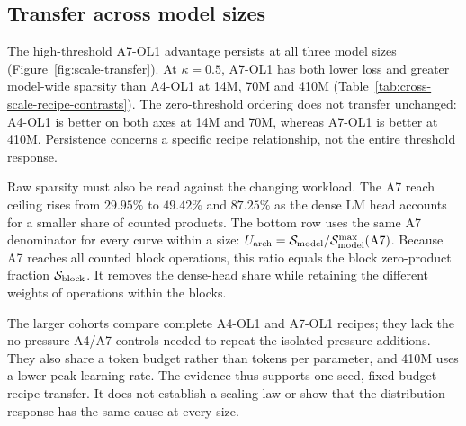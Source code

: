 \subsection{Transfer across model sizes}
\label{sec:scale-results}

The high-threshold A7-OL1 advantage persists at all three model sizes
(Figure~\ref{fig:scale-transfer}). At $\kappa=0.5$, A7-OL1 has both lower
loss and greater model-wide sparsity than A4-OL1 at 14M, 70M and 410M
(Table~\ref{tab:cross-scale-recipe-contrasts}). The zero-threshold ordering
does not transfer unchanged: A4-OL1 is better on both axes at 14M and 70M,
whereas A7-OL1 is better at 410M. Persistence concerns a specific recipe
relationship, not the entire threshold response.

Raw sparsity must also be read against the changing workload. The A7 reach
ceiling rises from $29.95\%$ to $49.42\%$ and $87.25\%$ as the dense LM
head accounts for a smaller share of counted products. The bottom row uses
the same A7 denominator for every curve within a size:
$U_{\mathrm{arch}}=\mathcal{S}_{\mathrm{model}}/\mathcal{S}_{\mathrm{model}}^{\max}(\mathrm{A7})$. Because A7 reaches all
counted block operations, this ratio equals the block zero-product fraction
$\mathcal{S}_{\mathrm{block}}$. It removes the dense-head share while retaining the different
weights of operations within the blocks.

The larger cohorts compare complete A4-OL1 and A7-OL1 recipes; they lack the
no-pressure A4/A7 controls needed to repeat the isolated pressure additions.
They also share a token budget rather than tokens per parameter, and 410M
uses a lower peak learning rate. The evidence thus supports one-seed,
fixed-budget recipe transfer. It does not establish a scaling law or show
that the distribution response has the same cause at every size.

